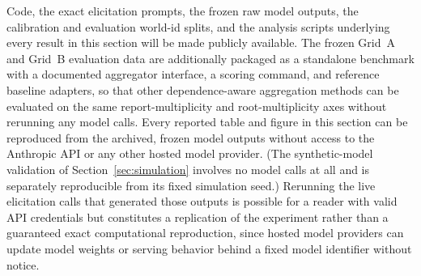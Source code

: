 Code, the exact elicitation prompts, the frozen raw model outputs, the
calibration and evaluation world-id splits, and the analysis scripts
underlying every result in this section will be made publicly available.
The frozen Grid~A and Grid~B evaluation data are additionally packaged as
a standalone benchmark with a documented aggregator interface, a scoring
command, and reference baseline adapters, so that other dependence-aware
aggregation methods can be evaluated on the same report-multiplicity and
root-multiplicity axes without rerunning any model calls.
Every reported table and figure in this section can be reproduced from
the archived, frozen model outputs without access to the Anthropic API or
any other hosted model provider. (The synthetic-model validation of
Section~\ref{sec:simulation} involves no model calls at all and is
separately reproducible from its fixed simulation seed.) Rerunning the live elicitation calls that generated those
outputs is possible for a reader with valid API credentials but
constitutes a replication of the experiment rather than a guaranteed exact
computational reproduction, since hosted model providers can update model
weights or serving behavior behind a fixed model identifier without
notice.
